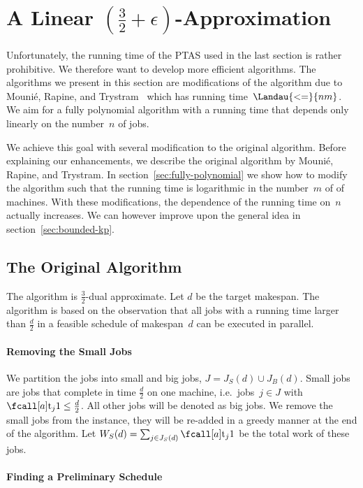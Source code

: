 \section{A Linear $(\frac{3}{2} + \epsilon)$-Approximation}
\label{sec:approximation}

Unfortunately, the running time of the PTAS used in the last section is rather prohibitive.
We therefore want to develop more efficient algorithms.
The algorithms we present in this section
are modifications of the algorithm due to Mounié, Rapine, and Trystram~\cite{mounie07}
which has running time~$\Landau{<=}{nm}$.
We aim for a fully polynomial algorithm
with a running time that depends only linearly on the number~$n$ of jobs.

We achieve this goal with several modification to the original algorithm.
Before explaining our enhancements, we describe the original algorithm
by Mounié, Rapine, and Trystram.
In section~\ref{sec:fully-polynomial}
we show how to modify the algorithm
such that the running time is logarithmic in the number~$m$ of of machines.
With these modifications, the dependence of the running time on~$n$ actually increases.
We can however improve upon the general idea in section~\ref{sec:bounded-kp}.


\subsection{The Original Algorithm}

The algorithm is $\frac{3}{2}$-dual approximate.
Let $d$ be the target makespan.
The algorithm is based on the observation that all jobs
with a running time larger than $\frac{d}{2}$ in a feasible schedule of makespan~$d$ can be executed in parallel.


\paragraph*{Removing the Small Jobs}

We partition the jobs into small and big jobs, $J = J_S(d) \cup J_B(d)$.
Small jobs are jobs that complete in time $\frac{d}{2}$ on one machine,
i.e.~jobs~$j \in J$ with $\ptm{j}{1} \leq \frac{d}{2}$.
All other jobs will be denoted as big jobs.
We remove the small jobs from the instance,
they will be re-added in a greedy manner at the end of the algorithm.
Let $W_S(d) = \sum_{j \in J_S(d)} \ptm{j}{1}$ be the total work of these jobs.


\paragraph*{Finding a Preliminary Schedule}
\label{sec:knapsack}

